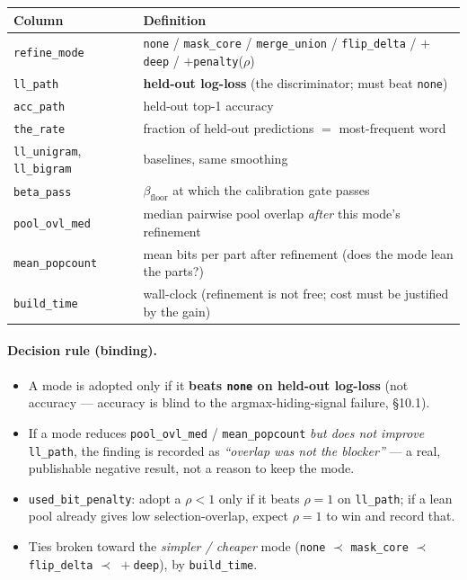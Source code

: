 \documentclass[11pt]{article}
\newcommand{\code}[1]{\texttt{#1}}
\begin{document}
\begin{center}
\begin{longtable}{@{}ll@{}}
\toprule
Column & Definition\\
\midrule
\endhead
\code{refine\_mode} & \code{none} / \code{mask\_core} / \code{merge\_union} / \code{flip\_delta} / $+$\code{deep} / $+$\code{penalty}($\rho$)\\
\code{ll\_path} & \textbf{held-out log-loss} (the discriminator; must beat \code{none})\\
\code{acc\_path} & held-out top-1 accuracy\\
\code{the\_rate} & fraction of held-out predictions $=$ most-frequent word\\
\code{ll\_unigram}, \code{ll\_bigram} & baselines, same smoothing\\
\code{beta\_pass} & $\beta_{\text{floor}}$ at which the calibration gate passes\\
\code{pool\_ovl\_med} & median pairwise pool overlap \emph{after} this mode's refinement\\
\code{mean\_popcount} & mean bits per part after refinement (does the mode lean the parts?)\\
\code{build\_time} & wall-clock (refinement is not free; cost must be justified by the gain)\\
\bottomrule
\end{longtable}
\end{center}

\paragraph{Decision rule (binding).}
\begin{itemize}[nosep]
\item A mode is adopted only if it \textbf{beats \code{none} on held-out log-loss} (not accuracy --- accuracy is blind to the argmax-hiding-signal failure, \S10.1).
\item If a mode reduces \code{pool\_ovl\_med} / \code{mean\_popcount} \emph{but does not improve} \code{ll\_path}, the finding is recorded as \emph{``overlap was not the blocker''} --- a real, publishable negative result, not a reason to keep the mode.
\item \code{used\_bit\_penalty}: adopt a $\rho<1$ only if it beats $\rho=1$ on \code{ll\_path}; if a lean pool already gives low selection-overlap, expect $\rho=1$ to win and record that.
\item Ties broken toward the \emph{simpler / cheaper} mode (\code{none} $\prec$ \code{mask\_core} $\prec$ \code{flip\_delta} $\prec$ ${}+$\code{deep}), by \code{build\_time}.
\end{itemize}
\end{document}
